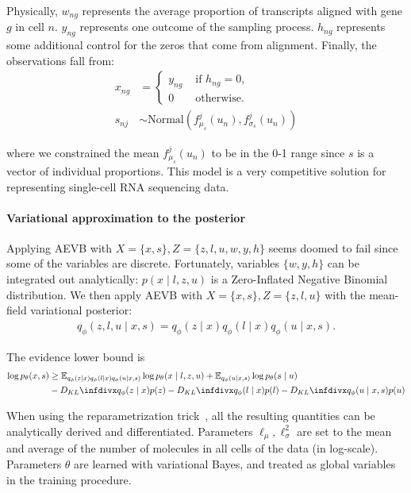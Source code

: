 Physically, $w_{ng}$ represents the average proportion of transcripts aligned with gene $g$ in cell $n$. $y_{ng}$ represents one outcome of the sampling process. $h_{ng}$ represents some additional control for the zeros that come from alignment. Finally, the observations fall from:
\begin{align}
    x_{ng} &=
\begin{cases}
y_{ng} & \text{ if } h_{ng} = 0,\\
0 & \text{ otherwise}.
\end{cases} \\
s_{nj} &\sim \textrm{Normal}(f_{\mu_s}^j(u_n), f_{\sigma_s}^j(u_n)) 
\end{align}

where we constrained the mean $f_{\mu_s}^j(u_n)$ to be in the 0-1 range since $s$ is a vector of individual proportions. This model is a very competitive solution for representing single-cell RNA sequencing data.

\paragraph{Variational approximation to the posterior}

Applying AEVB with $X = \{x, s\}, Z = \{z, l, u, w, y, h\}$ seems doomed to fail since some of the variables are discrete. Fortunately, variables $\{w, y, h\}$ can be integrated out analytically: $p(x \mid l, z, u)$ is a Zero-Inflated Negative Binomial distribution. We then apply AEVB with $X = \{x, s\}, Z = \{z, l, u\}$ with the mean-field variational posterior:
\begin{align}
  q_\phi(z, l, u \mid x, s) = q_\phi(z \mid x)q_\phi(l \mid x)q_\phi(u \mid x, s).
\end{align} 

The evidence lower bound is
\begin{equation}
\begin{split}
\log p_\theta(x, s) &\geq \mathbb{E}_{q_\phi(z \mid x)q_\phi(l \mid x)q_\phi(u \mid x, s)}\log p_\theta(x \mid l, z, u) + \mathbb{E}_{q_\phi(u \mid x, s)}\log p_\theta(s \mid u) \\
&- \kld{q_\phi(z \mid x)}{p(z)}- \kld{q_\phi(l \mid x)}{p(l)} - \kld{q_\phi(u \mid x, s)}{p(u)}
\end{split}
\end{equation}

When using the reparametrization trick~\cite{AEVB}, all the resulting quantities can be analytically derived and differentiated. Parameters $\ell_\mu, \ell_\sigma^2$ are set to the mean and average of the number of molecules in all cells of the data (in log-scale). Parameters $\theta$ are learned with variational Bayes, and treated as global variables in the training procedure.

